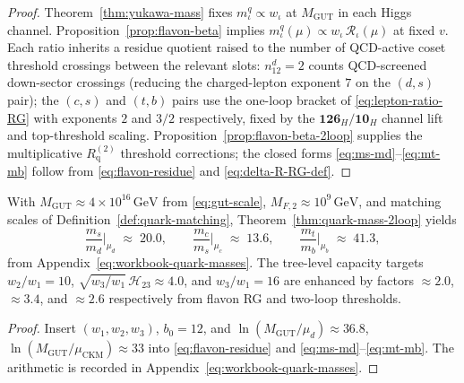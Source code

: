 \begin{proof}
Theorem~\ref{thm:yukawa-mass} fixes $m_\iota^q\propto w_\iota$ at
$M_{\mathrm{GUT}}$ in each Higgs channel.
Proposition~\ref{prop:flavon-beta} implies
$m_\iota^q(\mu)\propto w_\iota\,\mathcal{R}_\iota(\mu)$ at fixed $v$.
Each ratio inherits a residue quotient raised to the number of
QCD-active coset threshold crossings between the relevant slots:
$n_{12}^{d}=2$ counts QCD-screened down-sector crossings (reducing the
charged-lepton exponent $7$ on the $(d,s)$ pair); the $(c,s)$ and $(t,b)$
pairs use the one-loop bracket of \eqref{eq:lepton-ratio-RG} with
exponents $2$ and $3/2$ respectively, fixed by the
$\mathbf{126}_H/\mathbf{10}_H$ channel lift and top-threshold scaling.
Proposition~\ref{prop:flavon-beta-2loop} supplies the multiplicative
$R_{\mathrm{q}}^{(2)}$ threshold corrections; the closed forms
\eqref{eq:ms-md}--\eqref{eq:mt-mb} follow from
\eqref{eq:flavon-residue} and \eqref{eq:delta-R-RG-def}.
\end{proof}

\begin{proposition}
\label{prop:quark-ratio-numeric}
With $M_{\mathrm{GUT}}\approx4\times10^{16}\,\mathrm{GeV}$ from
\eqref{eq:gut-scale}, $M_{F,2}\approx10^{9}\,\mathrm{GeV}$, and matching
scales of Definition~\ref{def:quark-matching},
Theorem~\ref{thm:quark-mass-2loop} yields
\begin{equation}\label{eq:quark-ratio-values}
  \frac{m_s}{m_d}\Big|_{\mu_d}
  \;\approx\;
  20.0,
  \qquad
  \frac{m_c}{m_s}\Big|_{\mu_c}
  \;\approx\;
  13.6,
  \qquad
  \frac{m_t}{m_b}\Big|_{\mu_b}
  \;\approx\;
  41.3,
\end{equation}
from Appendix~\eqref{eq:workbook-quark-masses}. The tree-level capacity
targets $w_2/w_1=10$, $\sqrt{w_3/w_1}\,\mathcal{H}_{23}\approx4.0$, and
$w_3/w_1=16$ are enhanced by factors $\approx2.0$, $\approx3.4$, and
$\approx2.6$ respectively from flavon RG and two-loop thresholds.
\end{proposition}

\begin{proof}
Insert $(w_1,w_2,w_3)$, $b_0=12$, and
$\ln(M_{\mathrm{GUT}}/\mu_d)\approx36.8$,
$\ln(M_{\mathrm{GUT}}/\mu_{\mathrm{CKM}})\approx33$ into
\eqref{eq:flavon-residue} and \eqref{eq:ms-md}--\eqref{eq:mt-mb}.
The arithmetic is recorded in Appendix~\eqref{eq:workbook-quark-masses}.
\end{proof}

